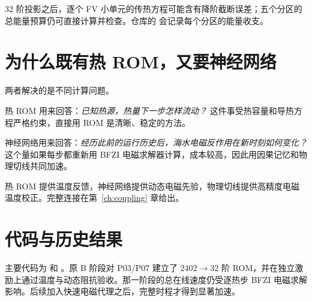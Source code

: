 32 阶投影之后，逐个 FV 小单元的传热方程可能含有降阶截断误差；五个分区的总能量预算仍可直接计算并检查。仓库的  会记录每个分区的能量收支。

\section{为什么既有热 ROM，又要神经网络}
两者解决的是不同计算问题。

热 ROM 用来回答：\emph{已知热源，热量下一步怎样流动？} 这件事受热容量和导热方程严格约束，直接用 ROM 是清晰、稳定的方法。

神经网络用来回答：\emph{经历此前的运行历史后，海水电磁反作用在新时刻如何变化？} 这个量如果每步都重新用 BFZI 电磁求解器计算，成本较高，因此用因果记忆和物理切线共同加速。

热 ROM 提供温度反馈，神经网络提供动态电磁先验，物理切线提供高精度电磁温度校正。完整连接在第~\ref{ch:coupling} 章给出。

\section{代码与历史结果}
主要代码为  和 。原 B 阶段对 P03/P07 建立了 2402$\to$32 阶 ROM，并在独立激励上通过温度与动态阻抗验收。那一阶段的总在线速度仍受逐热步 BFZI 电磁求解影响。后续加入快速电磁代理之后，完整时程才得到显著加速。
